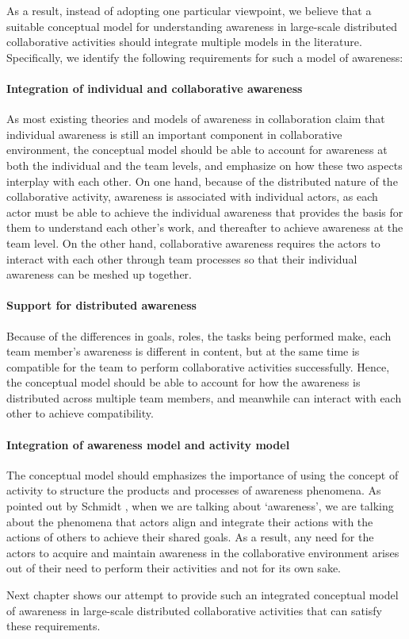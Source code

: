 As a result, instead of adopting one particular viewpoint, we believe that a suitable conceptual model for understanding awareness in large-scale distributed collaborative activities should integrate multiple models in the literature. Specifically, we identify the following requirements for such a model of awareness:

\paragraph*{Integration of individual and collaborative awareness} %
\label{par:the_integration_of_individual_and_collaborative_awareness}
As most existing theories and models of awareness in collaboration claim that individual awareness is still an important component in collaborative environment, the conceptual model should be able to account for awareness at both the individual and the team levels, and emphasize on how these two aspects interplay with each other. On one hand, because of the distributed nature of the collaborative activity, awareness is associated with individual actors, as each actor must be able to achieve the individual awareness that provides the basis for them to understand each other’s work, and thereafter to achieve awareness at the team level. On the other hand, collaborative awareness requires the actors to interact with each other through team processes so that their individual awareness can be meshed up together.

\paragraph*{Support for distributed awareness} %
\label{par:the_distributed_nature_of_awareness}
Because of the differences in goals, roles, the tasks being performed make, each team member’s awareness is different in content, but at the same time is compatible for the team to perform collaborative activities successfully. Hence, the conceptual model should be able to account for how the awareness is distributed across multiple team members, and meanwhile can interact with each other to achieve compatibility. 

\paragraph*{Integration of awareness model and activity model} %
\label{par:the_coupling_between_awareness_and_activity}
The conceptual model should emphasizes the importance of using the concept of activity to structure the products and processes of awareness phenomena. As pointed out by Schmidt \cite{schmidt2002a}, when we are talking about `awareness', we are talking about the phenomena that actors align and integrate their actions with the actions of others to achieve their shared goals. As a result, any need for the actors to acquire and maintain awareness in the collaborative environment arises out of their need to perform their activities and not for its own sake.

Next chapter shows our attempt to provide such an integrated conceptual model of awareness in large-scale distributed collaborative activities that can satisfy these requirements.

